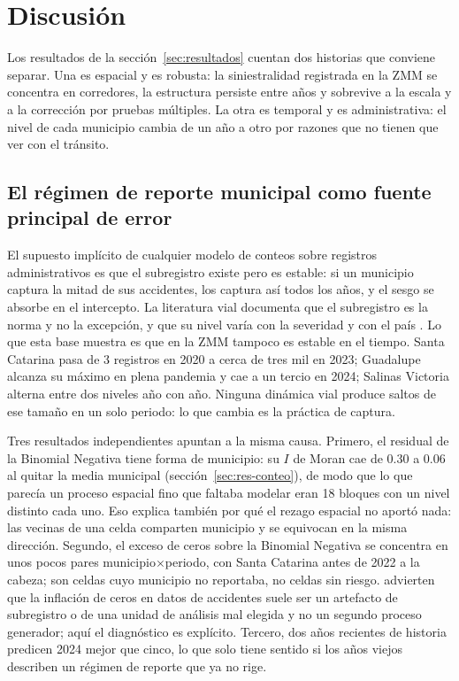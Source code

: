 \section{Discusión}\label{sec:discusion}

Los resultados de la sección~\ref{sec:resultados} cuentan dos historias que
conviene separar. Una es espacial y es robusta: la siniestralidad registrada
en la ZMM se concentra en corredores, la estructura persiste entre años y
sobrevive a la escala y a la corrección por pruebas múltiples. La otra es
temporal y es administrativa: el nivel de cada municipio cambia de un año a
otro por razones que no tienen que ver con el tránsito.

\subsection{El régimen de reporte municipal como fuente principal de error}\label{sec:disc-regimen}

El supuesto implícito de cualquier modelo de conteos sobre registros
administrativos es que el subregistro existe pero es estable: si un municipio
captura la mitad de sus accidentes, los captura así todos los años, y el sesgo
se absorbe en el intercepto. La literatura vial documenta que el subregistro
es la norma y no la excepción, y que su nivel varía con la severidad y con el
país \parencite{elvik1999}. Lo que esta base muestra es que en la ZMM
tampoco es estable en el tiempo. Santa Catarina pasa de 3 registros en 2020 a
cerca de tres mil en 2023; Guadalupe alcanza su máximo en plena pandemia y cae
a un tercio en 2024; Salinas Victoria alterna entre dos niveles año con año.
Ninguna dinámica vial produce saltos de ese tamaño en un solo periodo: lo que
cambia es la práctica de captura.

Tres resultados independientes apuntan a la misma causa. Primero, el residual
de la Binomial Negativa tiene forma de municipio: su $I$ de Moran cae de 0.30
a 0.06 al quitar la media municipal (sección~\ref{sec:res-conteo}), de modo que
lo que parecía un proceso espacial fino que faltaba modelar eran 18 bloques
con un nivel distinto cada uno. Eso explica también por qué el rezago espacial
no aportó nada: las vecinas de una celda comparten municipio y se equivocan en
la misma dirección. Segundo, el exceso de ceros sobre la Binomial Negativa se
concentra en unos pocos pares municipio$\times$periodo, con Santa Catarina antes
de 2022 a la cabeza; son celdas cuyo municipio no reportaba, no celdas sin
riesgo. \textcite{lord2005} advierten que la inflación de ceros en datos de
accidentes suele ser un artefacto de subregistro o de una unidad de análisis
mal elegida y no un segundo proceso generador; aquí el diagnóstico es
explícito. Tercero, dos años recientes de historia predicen 2024 mejor que
cinco, lo que solo tiene sentido si los años viejos describen un régimen de
reporte que ya no rige.

